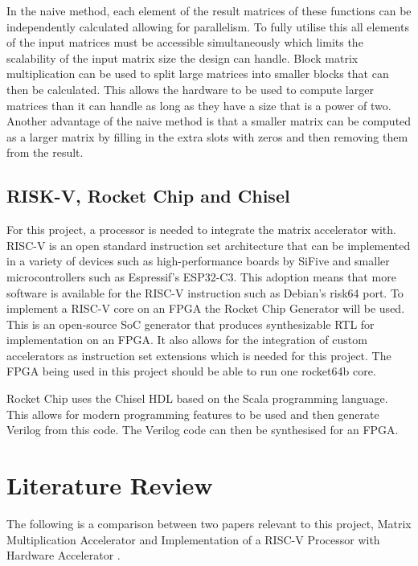 \documentclass[a4paper,fleqn,12pt]{article}
\begin{document}
	In the naive method, each element of the result matrices of these functions can be independently calculated allowing for parallelism. To fully utilise this all elements of the input matrices must be accessible simultaneously which limits the scalability of the input matrix size the design can handle. Block matrix multiplication can be used to split large matrices into smaller blocks that can then be calculated. This allows the hardware to be used to compute larger matrices than it can handle as long as they have a size that is a power of two. Another advantage of the naive method is that a smaller matrix can be computed as a larger matrix by filling in the extra slots with zeros and then removing them from the result.
	
	\subsection{RISK-V, Rocket Chip and Chisel}
	For this project, a processor is needed to integrate the matrix accelerator with. RISC-V is an open standard instruction set architecture that can be implemented in a variety of devices such as high-performance boards by SiFive and smaller microcontrollers such as Espressif's ESP32-C3. This adoption means that more software is available for the RISC-V instruction such as Debian's risk64 port. To implement a RISC-V core on an FPGA the Rocket Chip Generator will be used. This is an open-source SoC generator that produces synthesizable RTL for implementation on an FPGA. It also allows for the integration of custom accelerators as instruction set extensions \citep{rocketchip} which is needed for this project. The FPGA being used in this project should be able to run one rocket64b core.
	
	Rocket Chip uses the Chisel HDL based on the Scala programming language. This allows for modern programming features to be used and then generate Verilog from this code. The Verilog code can then be synthesised for an FPGA.
	
	\section{Literature Review}
	The following is a comparison between two papers relevant to this project, Matrix Multiplication Accelerator \citep{matrix_mult_accel} and Implementation of a RISC-V Processor with Hardware Accelerator \citep{risc-v_hard_accel}.
	
\end{document}
